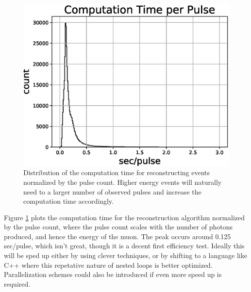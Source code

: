 \begin{figure}[H]
  \centering
  \includegraphics[width=12cm]{./Figures/reco_plots/computation_time_perpulse.eps}
  \caption{Distribution of the computation time for reconstructing events normalized by the pulse count. Higher energy events will naturally need to a larger number of observed pulses and increase the computation time accordingly. }
  \label{fig:comp_time}
\end{figure}

Figure \ref{fig:comp_time} plots the computation time for the reconstruction algorithm normalized by the pulse count, where the pulse count scales with the number of photons produced, and hence the energy of the muon. The peak occurs around 0.125 sec/pulse, which isn't great, though it is a decent first efficiency test. Ideally this will be sped up either by using clever techniques, or by shifting to a language like C++ where this repetative nature of nested loops is better optimized. Parallelization schemes could also be introduced if even more speed up is required. 



